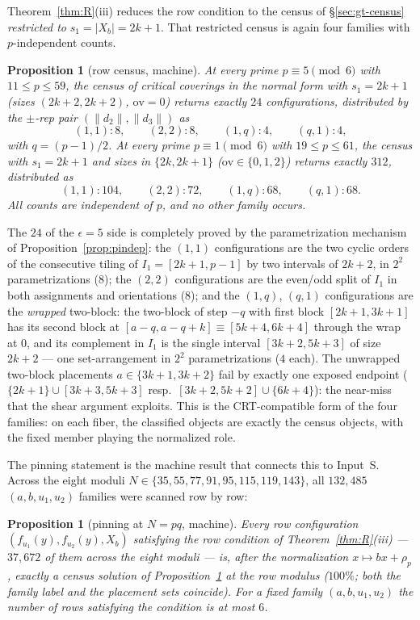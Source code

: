\documentclass[11pt,a4paper]{article}
\numberwithin{equation}{section}
\theoremstyle{plain}
\newtheorem{proposition}[theorem]{Proposition}
\theoremstyle{definition}
\theoremstyle{remark}
\begin{document}
Theorem~\ref{thm:R}(iii) reduces the row condition to the census of
\S\ref{sec:gt-census} \emph{restricted to} $s_1=|X_b|=2k+1$. That restricted
census is again four families with $p$-independent counts.

\begin{proposition}[row census, machine]\label{prop:rowcensus}
At every prime $p\equiv5\pmod6$ with $11\le p\le59$, the census of critical
coverings in the normal form with $s_1=2k+1$ (sizes $(2k{+}2,2k{+}2)$,
$\mathrm{ov}=0$) returns exactly $24$ configurations, distributed by the
$\pm$-rep pair $(\|d_2\|,\|d_3\|)$ as
\[
(1,1):8,\qquad(2,2):8,\qquad(1,q):4,\qquad(q,1):4,
\]
with $q=(p-1)/2$. At every prime $p\equiv1\pmod6$ with $19\le p\le61$, the
census with $s_1=2k+1$ and sizes in $\{2k,2k+1\}$ ($\mathrm{ov}\in\{0,1,2\}$)
returns exactly $312$, distributed as
\[
(1,1):104,\qquad(2,2):72,\qquad(1,q):68,\qquad(q,1):68.
\]
All counts are independent of $p$, and no other family occurs.
\end{proposition}

The $24$ of the $\epsilon=5$ side is completely proved by the parametrization
mechanism of Proposition~\ref{prop:pindep}: the $(1,1)$ configurations are the two
cyclic orders of the consecutive tiling of $I_1=[2k+1,p-1]$ by two intervals
of $2k+2$, in $2^2$ parametrizations ($8$); the $(2,2)$ configurations are
the even/odd split of $I_1$ in both assignments and orientations ($8$); and
the $(1,q)$, $(q,1)$ configurations are the \emph{wrapped} two-block: the
two-block of step $-q$ with first block $[2k+1,3k+1]$ has its second block at
$[a-q,a-q+k]\equiv[5k+4,6k+4]$ through the wrap at $0$, and its complement
in $I_1$ is the single interval $[3k+2,5k+3]$ of size $2k+2$ --- one
set-arrangement in $2^2$ parametrizations ($4$ each). The unwrapped two-block
placements $a\in\{3k+1,3k+2\}$ fail by exactly one exposed endpoint
($\{2k+1\}\cup[3k{+}3,5k{+}3]$ resp.\ $[3k{+}2,5k{+}2]\cup\{6k{+}4\}$): the
near-miss that the shear argument exploits. This is the CRT-compatible form
of the four families: on each fiber, the classified objects are exactly the
census objects, with the fixed member playing the normalized role.

The pinning statement is the machine result that connects this to
Input~S. Across the eight moduli
$N\in\{35,55,77,91,95,115,119,143\}$, all $132{,}485$ $(a,b,u_1,u_2)$
families were scanned row by row:

\begin{proposition}[pinning at $N=pq$, machine]\label{prop:pqpinned}
Every row configuration $(f_{u_1}(y),f_{u_2}(y),X_b)$ satisfying the row
condition of Theorem~\emph{\ref{thm:R}(iii)} --- $37{,}672$ of them across
the eight moduli --- is, after the normalization $x\mapsto bx+\rho_p$,
\emph{exactly} a census solution of Proposition~\ref{prop:rowcensus} at the
row modulus ($100\%$; both the family label and the placement sets coincide).
For a fixed family $(a,b,u_1,u_2)$ the number of rows satisfying the
condition is at most $6$.
\end{proposition}
\end{document}
